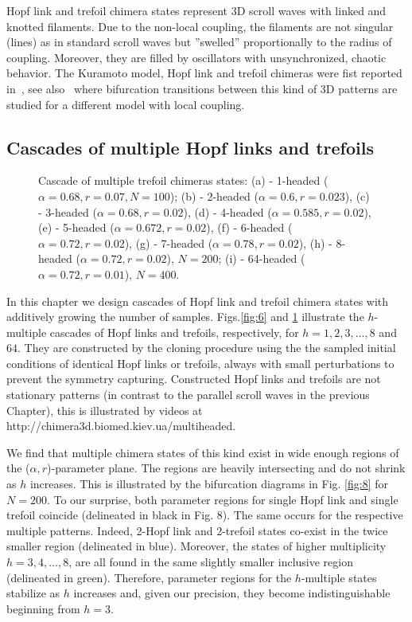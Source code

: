 \documentclass[epjST]{svjour}
\begin{document}
 Hopf link and trefoil chimera states represent 3D scroll waves with linked and knotted  filaments. Due to the non-local coupling, the filaments are not singular (lines) as in standard  scroll waves but ''swelled'' proportionally to the radius of coupling. Moreover, they are filled by oscillators with unsynchronized, chaotic  behavior.  The Kuramoto model, Hopf link and trefoil chimeras were fist reported in~\cite{ld2016}, see also~\cite{fm2000} where bifurcation transitions between this kind of 3D patterns are studied for a different model with local coupling.

\subsection{Cascades of multiple Hopf links and trefoils}

\begin{figure}[ht!]
\caption{Cascade of multiple trefoil chimeras states:  (a) - 1-headed ($\alpha=0.68, r=0.07, N=100 $); (b) - 2-headed ($\alpha=0.6, r=0.023 $),  (c) - 3-headed ($\alpha=0.68, r=0.02$), (d) - 4-headed ($\alpha=0.585, r=0.02$), (e) - 5-headed ($\alpha=0.672, r=0.02$), (f) - 6-headed ($\alpha=0.72, r=0.02$), (g) - 7-headed ($\alpha=0.78, r=0.02$), (h) - 8-headed ($\alpha=0.72, r=0.02$), $N=200$; (i) - 64-headed ($\alpha=0.72, r=0.01$), $N=400$.} 
  \label{fig:7}
\end{figure}

In this chapter we design cascades of Hopf link and trefoil chimera states with additively growing the number of samples.  
Figs.\ref{fig:6} and \ref{fig:7}  illustrate the $h$-multiple cascades of Hopf links and trefoils, respectively,  for $h=1,2,3,...,8$ and $64$. They are constructed by the cloning procedure using the the sampled initial conditions of identical Hopf links or trefoils, always with small perturbations to prevent the symmetry capturing.   Constructed Hopf links and trefoils are not stationary patterns (in contrast to the parallel scroll waves in the previous Chapter), this is illustrated by videos at
http://chimera3d.biomed.kiev.ua/multiheaded.


We find that  multiple chimera states of this kind exist in wide enough regions of the ($\alpha,r$)-parameter plane. The regions are heavily intersecting and do not shrink as $h$ increases. This is illustrated by the bifurcation diagrams in 
Fig. \ref{fig:8} for $N=200$.
To our surprise,  both parameter regions for single Hopf link and single trefoil coincide (delineated in black in Fig. 8). The same  occurs for the respective multiple patterns.  Indeed,  2-Hopf link and 2-trefoil states co-exist in the twice smaller region (delineated in blue).  Moreover, the states of higher multiplicity $h=3,4,...,8$,  are all found in the same slightly smaller inclusive region (delineated in green).   Therefore, parameter regions for the $h$-multiple states stabilize as $h$ increases 
and,  given our precision, they become indistinguishable beginning from $h=3$.
\end{document}
